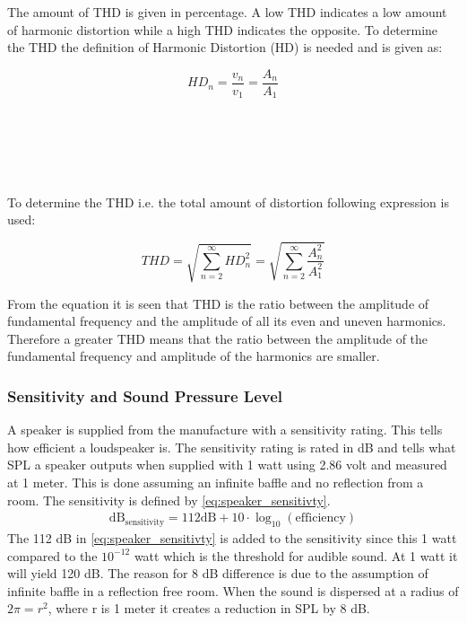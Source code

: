 The amount of THD is given in percentage. A low THD indicates a low amount of harmonic distortion while a high THD indicates the opposite. To determine the THD the definition of Harmonic Distortion (HD) is needed and is given as:

\begin{equation}
H\!D_n = \frac{v_n}{v_1} =\frac{A_n}{A_1}
\end{equation}
\begin{where}
\\
\\
\\
\\
\end{where}

To determine the THD i.e. the total amount of distortion following expression is used:

\begin{equation}
T\!H\!D = \sqrt{\sum_{n=2}^{\infty}H\!D_n^2} = \sqrt{\sum_{n=2}^{\infty}\frac{A_n^2}{A_1^2}}
\end{equation}

From the equation it is seen that THD is the ratio between the amplitude of fundamental frequency and the amplitude of all its even and uneven harmonics. Therefore a greater THD means that the ratio between the amplitude of the fundamental frequency and amplitude of the harmonics are smaller.


\subsubsection*{Sensitivity and Sound Pressure Level}

A speaker is supplied from the manufacture with a sensitivity rating. This tells how efficient a loudspeaker is. The sensitivity rating is rated in dB and tells what \gls{SPL} a speaker outputs when supplied with 1 watt using 2.86 volt and measured at 1 meter. This is done assuming an infinite baffle and no reflection from a room. The sensitivity is defined by \autoref{eq:speaker_sensitivty}.
\begin{align}\label{eq:speaker_sensitivty}
\text{dB}_\text{sensitivity}=112\text {dB} +10 \cdot \log_{10}(\text{efficiency})
\end{align}  
The 112 dB in \autoref{eq:speaker_sensitivty} is added to the sensitivity since this 1 watt compared to the $10^{-12}$ watt which is the threshold for audible sound. At 1 watt it will yield 120 dB. The reason for 8 dB difference is due to the assumption of infinite baffle in a reflection free room. When the sound is dispersed at a radius of $2\pi=r^2$, where r is 1 meter it creates a reduction in \gls{SPL} by 8 dB.

